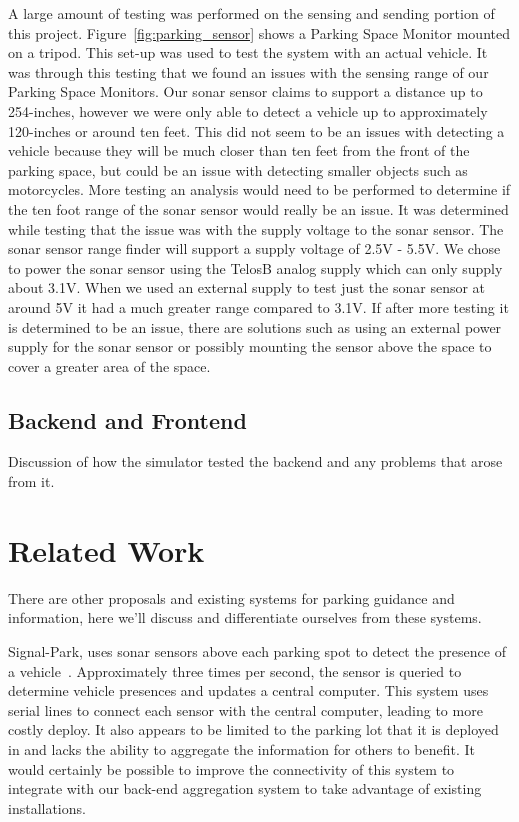 \documentclass{acm_proc}
\begin{document}
A large amount of testing was performed on the sensing and sending portion
of this project.  Figure~\ref{fig:parking_sensor}  shows a Parking Space
Monitor mounted on a tripod.  This set-up was used to test the system with
an actual vehicle.  It was through this testing that we found an issues
with the sensing range of our Parking Space Monitors.
Our sonar sensor claims to support a distance up to 254-inches, however we
were only able to detect a vehicle up to approximately 120-inches or around
ten feet.  This did not seem to be an issues with detecting a vehicle
because they will be much closer than ten feet from the front of the
parking space, but could be an issue with detecting smaller objects such as
motorcycles.  More testing an analysis would need to be performed to
determine if the ten foot range of the
sonar sensor
would really be an issue.  It was determined while testing that the issue
was with the supply voltage to the sonar sensor.
The sonar sensor range finder will support a supply voltage of 2.5V - 5.5V.
We chose to power the sonar sensor using the TelosB analog supply which can
only supply about 3.1V.
When we used an external supply to test just the sonar sensor at around 5V
it had a much greater range compared to 3.1V.
If after more testing it is determined to be an issue, there are solutions
such as using an external power supply for the sonar sensor or possibly
mounting the sensor above the space to cover a greater area of the space. 

\subsection{Backend and Frontend}

Discussion of how the simulator tested the backend and any problems that
arose from it.

\section{Related Work}\label{sec:related}

There are other proposals and existing systems for parking guidance and
information, here we'll discuss and differentiate ourselves from these
systems.

Signal-Park, uses sonar sensors above each parking spot to detect the
presence of a vehicle~\cite{pgi:signal-park}.
Approximately three times per second, the sensor is queried to determine
vehicle presences and updates a central computer.
This system uses serial lines to connect each sensor with the central
computer, leading to more costly deploy.
It also appears to be limited to the parking lot that it is deployed in and
lacks the ability to aggregate the information for others to benefit.
It would certainly be possible to improve the connectivity of this system
to integrate with our back-end aggregation system to take advantage of
existing installations.
\end{document}
